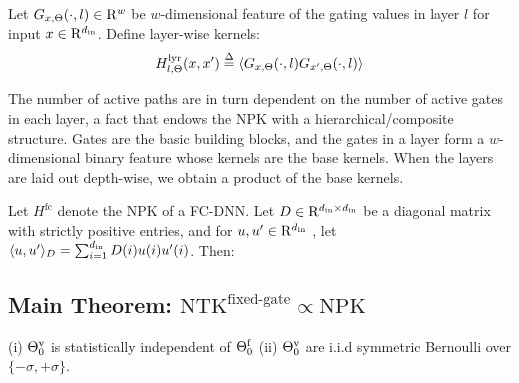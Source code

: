 %
\begin{definition}\label{def:layerkernel} Let $G_{x,\Theta}(\cdot,l)\in\mathrm{R}^w$ be $w$-dimensional feature of the gating values in layer $l$ for input $x\in\mathrm{R}^{d_{\text{in}}}$.  Define layer-wise kernels:
\begin{align*}
H^{\text{lyr}}_{l,\Theta}(x,x')\stackrel{\Delta}{=}\langle G_{x,\Theta}(\cdot,l)G_{x',\Theta}(\cdot,l)\rangle
\end{align*}
\end{definition}
The number of active paths are in turn dependent on the number of active gates in each layer, a fact that endows the NPK with a hierarchical/composite structure. Gates are the basic building blocks, and the gates in a layer form a $w$-dimensional binary feature whose kernels are the base kernels. When the layers are laid out depth-wise, we obtain a product of the base kernels. 
\begin{lemma}\label{lm:productkernel}
 Let $H^{\text{fc}}$ denote the NPK of a FC-DNN. Let $D\in\mathrm{R}^{d_{\text{in}}\times d_{\text{in}}}$ be a diagonal matrix with strictly positive entries, and for $u,u'\in\mathrm{R}^{d_{\text{in}}}$ , let $\langle u,u'\rangle_{D}=\sum_{i=1}^{d_{\text{in}}}D(i)u(i)u'(i)$. Then:
\end{lemma}
\subsection{Main Theorem: $\text{NTK}^{\text{fixed-gate}}\propto\text{NPK}$}
\begin{assumption}\label{assmp:main}
(i) ${\Theta}^{\text{v}}_0$ is statistically independent of $\Theta^{\textrm{f}}_0$ (ii) ${\Theta}^{\text{v}}_0$ are i.i.d symmetric Bernoulli over $\{-{\sigma},+{\sigma}\}$. 
\end{assumption}

